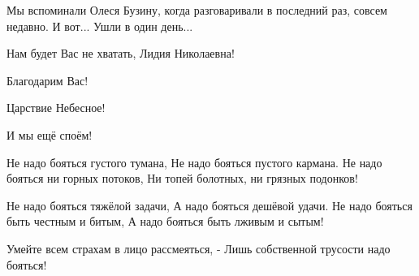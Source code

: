 Мы вспоминали Олеся Бузину, когда разговаривали в последний раз, совсем недавно. И вот... Ушли в один день...     

Нам будет Вас не хватать, Лидия Николаевна!

Благодарим Вас!

Царствие Небесное!

И мы ещё споём!

Не надо бояться густого тумана,
Не надо бояться пустого кармана.
Не надо бояться ни горных потоков,
Ни топей болотных, ни грязных подонков!

Не надо бояться тяжёлой задачи,
А надо бояться дешёвой удачи.
Не надо бояться быть честным и битым,
А надо бояться быть лживым и сытым!

Умейте всем страхам в лицо рассмеяться, -
Лишь собственной трусости надо бояться!
